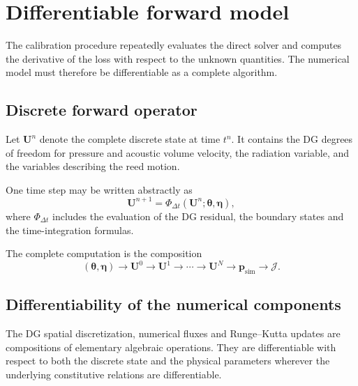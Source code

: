 \documentclass[11pt,a4paper]{report}
\theoremstyle{plain}
\theoremstyle{definition}
\begin{document}

\section{Differentiable forward model}
\label{sec:differentiable_forward_model}

The calibration procedure repeatedly evaluates the direct solver and computes
the derivative of the loss with respect to the unknown quantities. The numerical
model must therefore be differentiable as a complete algorithm.

\subsection{Discrete forward operator}

Let \(\mathbf{U}^n\) denote the complete discrete state at time \(t^n\). It
contains the DG degrees of freedom for pressure and acoustic volume velocity,
the radiation variable, and the variables describing the reed motion.

One time step may be written abstractly as
\begin{equation}
\mathbf{U}^{n+1}
=
\Phi_{\Delta t}
\left(
\mathbf{U}^n;
\boldsymbol{\theta},
\boldsymbol{\eta}
\right),
\label{eq:time_step_operator}
\end{equation}
where \(\Phi_{\Delta t}\) includes the evaluation of the DG residual, the
boundary states and the time-integration formulas.

The complete computation is the composition
\begin{equation}
(\boldsymbol{\theta},\boldsymbol{\eta})
\longrightarrow
\mathbf{U}^0
\longrightarrow
\mathbf{U}^1
\longrightarrow
\cdots
\longrightarrow
\mathbf{U}^{N}
\longrightarrow
\mathbf{p}_{\mathrm{sim}}
\longrightarrow
\mathcal{J}.
\label{eq:computational_graph}
\end{equation}

\subsection{Differentiability of the numerical components}

The DG spatial discretization, numerical fluxes and Runge--Kutta updates are
compositions of elementary algebraic operations. They are differentiable with
respect to both the discrete state and the physical parameters wherever the
underlying constitutive relations are differentiable.
\end{document}
